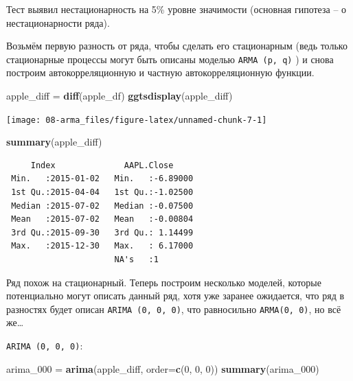 \documentclass[]{book}
\newenvironment{Shaded}{\begin{snugshade}}{\end{snugshade}}
\newcommand{\DataTypeTok}[1]{\textcolor[rgb]{0.13,0.29,0.53}{#1}}
\newcommand{\DecValTok}[1]{\textcolor[rgb]{0.00,0.00,0.81}{#1}}
\newcommand{\KeywordTok}[1]{\textcolor[rgb]{0.13,0.29,0.53}{\textbf{#1}}}
\newcommand{\NormalTok}[1]{#1}
\newcommand{\StringTok}[1]{\textcolor[rgb]{0.31,0.60,0.02}{#1}}
\begin{document}
Тест выявил нестационарность на 5\% уровне значимости (основная гипотеза -- о нестационарности ряда).

Возьмём первую разность от ряда, чтобы сделать его стационарным (ведь только стационарные процессы могут быть описаны моделью \texttt{ARMA\ (p,\ q)} ) и снова построим автокорреляционную и частную автокорреляционную функции.

\begin{Shaded}
\begin{Highlighting}[]
\NormalTok{apple_diff =}\StringTok{ }\KeywordTok{diff}\NormalTok{(apple_df)}
\KeywordTok{ggtsdisplay}\NormalTok{(apple_diff)}
\end{Highlighting}
\end{Shaded}

\begin{center}\texttt{[image: 08-arma\_files/figure-latex/unnamed-chunk-7-1]} \end{center}

\begin{Shaded}
\begin{Highlighting}[]
\KeywordTok{summary}\NormalTok{(apple_diff)}
\end{Highlighting}
\end{Shaded}

\begin{verbatim}
     Index              AAPL.Close      
 Min.   :2015-01-02   Min.   :-6.89000  
 1st Qu.:2015-04-04   1st Qu.:-1.02500  
 Median :2015-07-02   Median :-0.07500  
 Mean   :2015-07-02   Mean   :-0.00804  
 3rd Qu.:2015-09-30   3rd Qu.: 1.14499  
 Max.   :2015-12-30   Max.   : 6.17000  
                      NA's   :1         
\end{verbatim}

Ряд похож на стационарный. Теперь построим несколько моделей, которые потенциально могут описать данный ряд, хотя уже заранее ожидается, что ряд в разностях будет описан \texttt{ARIMA\ (0,\ 0,\ 0)}, что равносильно \texttt{ARMA(0,\ 0)}, но всё же\ldots{}

\texttt{ARIMA\ (0,\ 0,\ 0)}:

\begin{Shaded}
\begin{Highlighting}[]
\NormalTok{arima_}\DecValTok{000}\NormalTok{ =}\StringTok{ }\KeywordTok{arima}\NormalTok{(apple_diff, }\DataTypeTok{order=}\KeywordTok{c}\NormalTok{(}\DecValTok{0}\NormalTok{, }\DecValTok{0}\NormalTok{, }\DecValTok{0}\NormalTok{))}
\KeywordTok{summary}\NormalTok{(arima_}\DecValTok{000}\NormalTok{)}
\end{Highlighting}
\end{Shaded}
\end{document}
